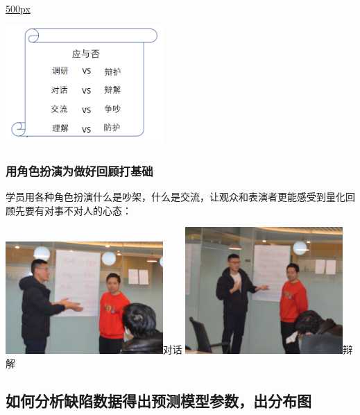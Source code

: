 \href{文件:_游戏1应与否1.png}{500px}

\includegraphics[width=6cm]{游戏1应与否1.png}

\hypertarget{ux7528ux89d2ux8272ux626eux6f14ux4e3aux505aux597dux56deux987eux6253ux57faux7840}{%
\subsubsection{用角色扮演为做好回顾打基础}\label{ux7528ux89d2ux8272ux626eux6f14ux4e3aux505aux597dux56deux987eux6253ux57faux7840}}

学员用各种角色扮演什么是吵架，什么是交流，让观众和表演者更能感受到量化回顾先要有对事不对人的心态：



\includegraphics[width=6cm]{1498.png}\textbar{}对话 \includegraphics[width=6cm]{1499.png}\textbar{}辩解

\hypertarget{ux5982ux4f55ux5728ux8fedux4ee3ux56deux987eux65f6ux5206ux6790ux7f3aux9677ux6570ux636eux5f97ux51faux9884ux6d4bux6a21ux578bux53c2ux6570}{%
\subsection{如何分析缺陷数据得出预测模型参数，出分布图}\label{ux5982ux4f55ux5728ux8fedux4ee3ux56deux987eux65f6ux5206ux6790ux7f3aux9677ux6570ux636eux5f97ux51faux9884ux6d4bux6a21ux578bux53c2ux6570}}

